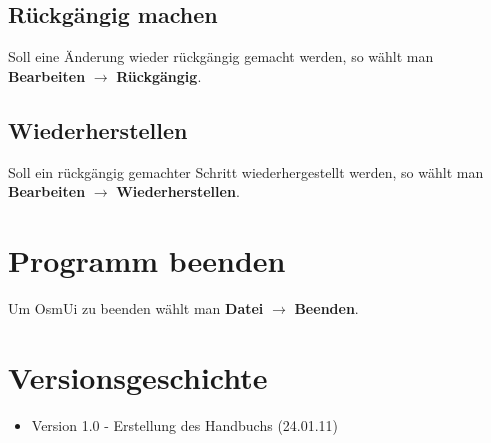 \documentclass[a4paper,10pt]{scrartcl}
\begin{document}
\subsection{Rückgängig machen}
Soll eine Änderung wieder rückgängig gemacht werden, so wählt man \textbf{Bearbeiten} $\rightarrow$ \textbf{Rückgängig}.
\subsection{Wiederherstellen}
Soll ein rückgängig gemachter Schritt wiederhergestellt werden, so wählt man \textbf{Bearbeiten} $\rightarrow$ \textbf{Wiederherstellen}.

\section{Programm beenden}
Um OsmUi zu beenden wählt man \textbf{Datei} $\rightarrow$ \textbf{Beenden}.

\section{Versionsgeschichte}
\begin{itemize}
\item Version 1.0 - Erstellung des Handbuchs (24.01.11)
\end{itemize}
\end{document}
